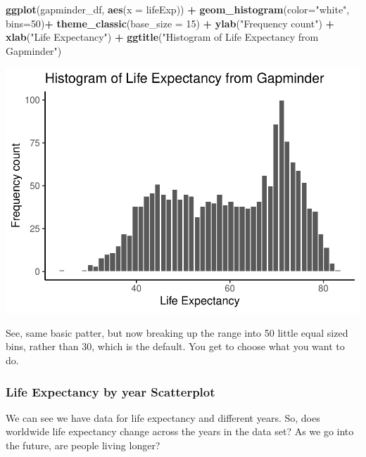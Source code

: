 \documentclass[
]{book}
\newenvironment{Shaded}{\begin{snugshade}}{\end{snugshade}}
\newcommand{\AttributeTok}[1]{\textcolor[rgb]{0.13,0.29,0.53}{#1}}
\newcommand{\DecValTok}[1]{\textcolor[rgb]{0.00,0.00,0.81}{#1}}
\newcommand{\FunctionTok}[1]{\textcolor[rgb]{0.13,0.29,0.53}{\textbf{#1}}}
\newcommand{\NormalTok}[1]{#1}
\newcommand{\SpecialCharTok}[1]{\textcolor[rgb]{0.81,0.36,0.00}{\textbf{#1}}}
\newcommand{\StringTok}[1]{\textcolor[rgb]{0.31,0.60,0.02}{#1}}
\begin{document}
\begin{Shaded}
\begin{Highlighting}[]
\FunctionTok{ggplot}\NormalTok{(gapminder\_df, }\FunctionTok{aes}\NormalTok{(}\AttributeTok{x =}\NormalTok{ lifeExp)) }\SpecialCharTok{+}
  \FunctionTok{geom\_histogram}\NormalTok{(}\AttributeTok{color=}\StringTok{"white"}\NormalTok{, }\AttributeTok{bins=}\DecValTok{50}\NormalTok{)}\SpecialCharTok{+} 
  \FunctionTok{theme\_classic}\NormalTok{(}\AttributeTok{base\_size =} \DecValTok{15}\NormalTok{) }\SpecialCharTok{+}
  \FunctionTok{ylab}\NormalTok{(}\StringTok{"Frequency count"}\NormalTok{) }\SpecialCharTok{+} 
  \FunctionTok{xlab}\NormalTok{(}\StringTok{"Life Expectancy"}\NormalTok{) }\SpecialCharTok{+}
  \FunctionTok{ggtitle}\NormalTok{(}\StringTok{"Histogram of Life Expectancy from Gapminder"}\NormalTok{)}
\end{Highlighting}
\end{Shaded}

\includegraphics{Statistics_Lab_files/figure-latex/1gapminderC-1.pdf}

See, same basic patter, but now breaking up the range into 50 little equal sized bins, rather than 30, which is the default. You get to choose what you want to do.

\hypertarget{life-expectancy-by-year-scatterplot}{%
\subsubsection{Life Expectancy by year Scatterplot}\label{life-expectancy-by-year-scatterplot}}

We can see we have data for life expectancy and different years. So, does worldwide life expectancy change across the years in the data set? As we go into the future, are people living longer?
\end{document}
